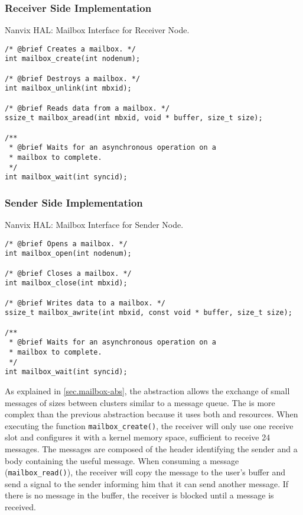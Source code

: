 			\subsubsection{Receiver Side Implementation}

\begin{listing}[!tb]
\caption{Nanvix HAL: Mailbox Interface for Receiver Node.}
\label{code:hal-mailbox-receiver}
\begin{verbatim}
/* @brief Creates a mailbox. */
int mailbox_create(int nodenum);

/* @brief Destroys a mailbox. */
int mailbox_unlink(int mbxid);

/* @brief Reads data from a mailbox. */
ssize_t mailbox_aread(int mbxid, void * buffer, size_t size);

/**
 * @brief Waits for an asynchronous operation on a
 * mailbox to complete.
 */
int mailbox_wait(int syncid);
\end{verbatim}
\end{listing}

			\subsubsection{Sender Side Implementation}

\begin{listing}[!tb]
\caption{Nanvix HAL: Mailbox Interface for Sender Node.}
\label{code:hal-mailbox-sender}
\begin{verbatim}
/* @brief Opens a mailbox. */
int mailbox_open(int nodenum);

/* @brief Closes a mailbox. */
int mailbox_close(int mbxid);

/* @brief Writes data to a mailbox. */
ssize_t mailbox_awrite(int mbxid, const void * buffer, size_t size);

/**
 * @brief Waits for an asynchronous operation on a
 * mailbox to complete.
 */
int mailbox_wait(int syncid);
\end{verbatim}
\end{listing}

				As explained in \autoref{sec.mailbox-abs}, the \mailbox abstraction
				allows the exchange of small messages of sizes between clusters similar
				to a \posix message queue.
				The \mailbox is more complex than the previous abstraction because it
				uses both \dnoc and \cnoc resources.
				When executing the function \texttt{mailbox\_create()}, the receiver
				will only use one \dnoc receive slot and configures it with a kernel
				memory space, sufficient to receive 24 messages.
				The messages are composed of the header identifying the sender
				and a body containing the useful message.
				When consuming a message (\texttt{mailbox\_read()}), the receiver
				will copy the message to the user's buffer and send a signal
				to the sender informing him that it can send another message.
				If there is no message in the buffer, the receiver is blocked
				until a message is received.

